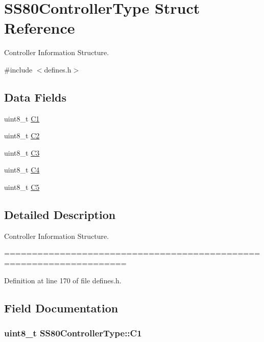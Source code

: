 \hypertarget{structSS80ControllerType}{}\section{S\+S80\+Controller\+Type Struct Reference}
\label{structSS80ControllerType}


Controller Information Structure.  




{\ttfamily \#include $<$defines.\+h$>$}

\subsection*{Data Fields}
\begin{DoxyCompactItemize}
\item 
uint8\+\_\+t \hyperlink{structSS80ControllerType_aa71282f54bf2b38fd8ace152aa9221b7}{C1}
\item 
uint8\+\_\+t \hyperlink{structSS80ControllerType_a99a2d4b94a756273b7ad2e4bdc786de8}{C2}
\item 
uint8\+\_\+t \hyperlink{structSS80ControllerType_acdbaaa95ad03c2a60f9e5cb0f9558ff8}{C3}
\item 
uint8\+\_\+t \hyperlink{structSS80ControllerType_a1d3d0ce7719f1fcb2d4c8c0c70750cdf}{C4}
\item 
uint8\+\_\+t \hyperlink{structSS80ControllerType_ae968d050e8c1a5b20a607dd16b4322c8}{C5}
\end{DoxyCompactItemize}


\subsection{Detailed Description}
Controller Information Structure. 

==================================================================== 

Definition at line 170 of file defines.\+h.



\subsection{Field Documentation}
\subsubsection[{\texorpdfstring{C1}{C1}}]{\setlength{\rightskip}{0pt plus 5cm}uint8\+\_\+t S\+S80\+Controller\+Type\+::\+C1}\hypertarget{structSS80ControllerType_aa71282f54bf2b38fd8ace152aa9221b7}{}\label{structSS80ControllerType_aa71282f54bf2b38fd8ace152aa9221b7}


